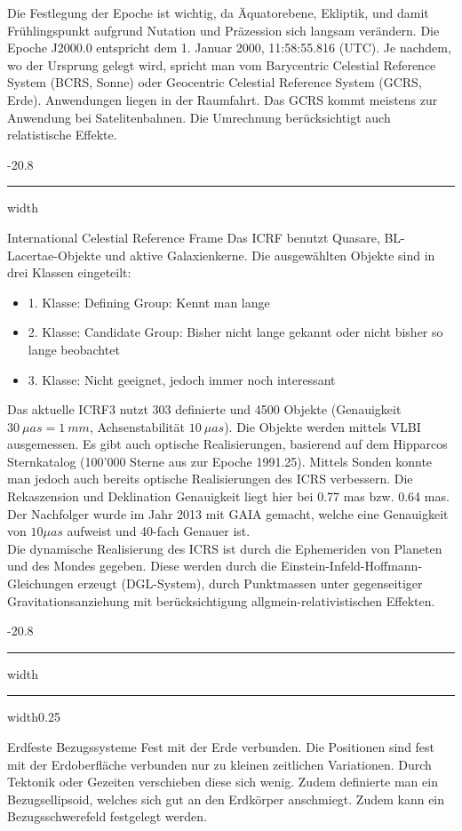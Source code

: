 \documentclass[9pt, landscape, fleqn]{scrartcl}
\makeatletter
\renewcommand{\subsection}{\@startsection{subsection}{1}{0mm}%
{-2\baselineskip}{0.8\baselineskip}%
{\hrule depth 0.2pt width\columnwidth\hrule depth0.75pt
width0.25\columnwidth\vspace*{1.2em}\large\bfseries\rmfamily}}
\renewcommand{\subsubsection}{\@startsection{subsubsection}{1}{0mm}%
{-2\baselineskip}{0.8\baselineskip}%
{\hrule depth 0.2pt width\columnwidth\vspace*{1.2em}\normalsize\bfseries\rmfamily}}
\makeatother
\begin{document}
\begin{multicols*}{3}
Die Festlegung der Epoche ist wichtig, da Äquatorebene, Ekliptik, und damit Frühlingspunkt aufgrund Nutation und Präzession sich langsam verändern.
Die Epoche J2000.0 entspricht dem 1. Januar 2000, 11:58:55.816 (UTC). Je nachdem, wo der Ursprung gelegt wird, spricht man vom Barycentric Celestial Reference System (BCRS, Sonne) oder Geocentric Celestial Reference System (GCRS, Erde). Anwendungen liegen in der Raumfahrt. Das GCRS kommt meistens zur Anwendung bei Satelitenbahnen.
Die Umrechnung berücksichtigt auch relatistische Effekte.

\subsubsection{International Celestial Reference Frame}
Das ICRF benutzt Quasare, BL-Lacertae-Objekte und aktive Galaxienkerne. Die ausgewählten Objekte sind in drei Klassen eingeteilt:
\begin{itemize}
    \item 1. Klasse: Defining Group: Kennt man lange
    \item 2. Klasse: Candidate Group: Bisher nicht lange gekannt oder nicht bisher so lange beobachtet
    \item 3. Klasse: Nicht geeignet, jedoch immer noch interessant
\end{itemize}

Das aktuelle ICRF3 nutzt 303 definierte und 4500 Objekte (Genauigkeit $30~\mu as = 1~mm$, Achsenstabilität $10~\mu as$). Die Objekte werden mittels VLBI ausgemessen. Es gibt auch optische Realisierungen, basierend auf dem Hipparcos Sternkatalog (100'000 Sterne aus zur Epoche 1991.25). Mittels Sonden konnte man jedoch auch bereits optische Realisierungen des ICRS verbessern. Die Rekaszension und Deklination Genauigkeit liegt hier bei 0.77 mas bzw. 0.64 mas. Der Nachfolger wurde im Jahr 2013 mit GAIA gemacht, welche eine Genauigkeit von $10 \mu as $ aufweist und 40-fach Genauer ist.\\

Die dynamische Realisierung des ICRS ist durch die Ephemeriden von Planeten und des Mondes gegeben. Diese werden durch die Einstein-Infeld-Hoffmann-Gleichungen erzeugt (DGL-System), durch Punktmassen unter gegenseitiger Gravitationsanziehung mit berücksichtigung allgmein-relativistischen Effekten.

\subsection{Erdfeste Bezugssysteme}
Fest mit der Erde verbunden. Die Positionen sind fest mit der Erdoberfläche verbunden nur zu kleinen zeitlichen Variationen. Durch Tektonik oder Gezeiten verschieben diese sich wenig. Zudem definierte man ein Bezugsellipsoid, welches sich gut an den Erdkörper anschmiegt. Zudem kann ein Bezugsschwerefeld festgelegt werden.


\end{multicols*}
\end{document}
